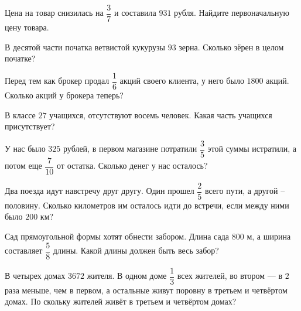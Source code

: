 %
%

\begin{class}[number=1]
	\begin{listofex}
		\item Цена на товар снизилась на \(\dfrac{3}{7}\) и составила \(931\) рубля. Найдите первоначальную цену товара.
		\item В десятой части початка ветвистой кукурузы \(93\) зерна. Сколько зёрен в целом початке?
		\item Перед тем как брокер продал \( \dfrac{1}{6} \) акций своего клиента, у него было \(1800\) акций. Сколько акций у брокера теперь?
		\item В классе  \(27\)  учащихся, отсутствуют восемь человек. Какая часть учащихся присутствует?
		\item У нас было  \(325\)  рублей, в первом магазине потратили \(\dfrac{3}{5}\) этой суммы истратили, а потом еще \(\dfrac{7}{10}\) от остатка. Сколько денег у нас осталось?
		\item Два поезда идут навстречу друг другу. Один прошел \(\dfrac{2}{5}\) всего пути, а другой – половину. Сколько километров им осталось идти до встречи, если между ними было \(200\) км?
		\item Сад прямоугольной формы хотят обнести забором. Длина  сада \(800\) м, а ширина составляет \(\dfrac{5}{8}\) длины. Какой длины должен быть весь забор?
		\item В четырех домах \(3672\) жителя. В одном доме \(\dfrac{1}{3}\) всех жителей, во втором --- в \(2\) раза меньше, чем в первом, а остальные живут поровну в третьем и четвёртом домах. По скольку жителей живёт в третьем и четвёртом домах?
	\end{listofex}
\end{class}

